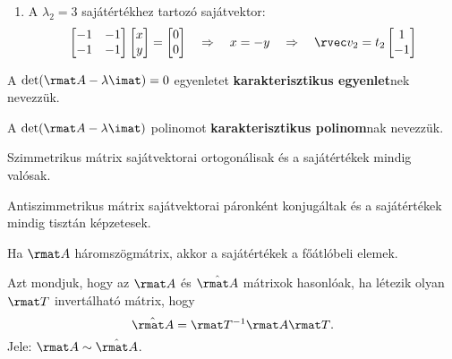\documentclass[a4paper, 12pt]{scrartcl}
\begin{document}
\begin{example}
\begin{enumerate}
    \item A $\lambda_2 = 3$ sajátértékhez tartozó sajátvektor:
          $$
            \begin{bmatrix}
              -1 & -1 \\
              -1 & -1
            \end{bmatrix} \begin{bmatrix}
              x \\
              y
            \end{bmatrix} = \begin{bmatrix}
              0 \\
              0
            \end{bmatrix}
            \quad \Rightarrow \quad
            x = -y
            \quad \Rightarrow \quad
            \rvec v_2 = t_2 \begin{bmatrix}
              1 \\
              -1
            \end{bmatrix}
          $$
  \end{enumerate}
\end{example}

\begin{note}
  A $\det(\rmat A - \lambda \imat) = 0$ egyenletet \textbf{karakterisztikus
    egyenlet}nek nevezzük.

  A $\det(\rmat A - \lambda \imat)$ polinomot \textbf{karakterisztikus
    polinom}nak nevezzük.
\end{note}

\begin{theorem}[Főtengelytétel]
  Szimmetrikus mátrix sajátvektorai ortogonálisak és a sajátértékek mindig
  valósak.

  Antiszimmetrikus mátrix sajátvektorai páronként konjugáltak és a sajátértékek
  mindig tisztán képzetesek.
\end{theorem}

\begin{statement}
  Ha $\rmat A$ háromszögmátrix, akkor a sajátértékek a főátlóbeli elemek.
\end{statement}

\begin{definition}[Hasonlóság]
  Azt mondjuk, hogy az $\rmat A$ és $\hat{\rmat A}$ mátrixok hasonlóak, ha
  létezik olyan $\rmat T$ invertálható mátrix, hogy
  $$
    \hat{\rmat A} = \rmat T^{-1} \rmat A \rmat T
    \text.
  $$
  Jele: $\rmat A \sim \hat{\rmat A}$.
\end{definition}
\end{document}
